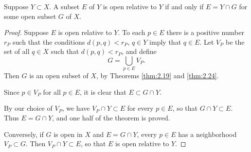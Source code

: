 \begin{thm}
    \label{thm:2.30}
    Suppose $Y \subset X$. A subset $E$ of $Y$ is open relative to $Y$ if and only if $E = Y \cap G$ for some open subset $G$ of $X$.
\end{thm}
\begin{proof}
    Suppose $E$ is open relative to $Y$. 
    To each $p \in E$ there is a positive number $r_P$ 
    such that the conditions $d(p, q) < r_P$, 
    $q \in Y$ imply that $q \in E$. 
    Let $V_P$ be the set of all $q \in X$ 
    such that $d(p, q) < r_P$, and define
    \begin{equation*}
        G = \bigcup_{p \in E} V_P.
    \end{equation*}
    Then $G$ is an open subset of $X$, by Theorems \ref{thm:2.19} and \ref{thm:2.24}. 

    Since $p \in V_P$ for all $p \in E$, 
    it is clear that $E \subset G \cap Y$.
    
    By our choice of $V_P$, 
    we have $V_P \cap Y \subset E$ for every $p \in E$, 
    so that $G \cap Y \subset E$. 
    Thus $E = G \cap Y$, and one half of the theorem is proved.
    
    Conversely, if $G$ is open in $X$ and $E = G \cap Y$, 
    every $p \in E$ has a neighborhood $V_P \subset G$. 
    Then $V_P \cap Y \subset E$, 
    so that $E$ is open relative to $Y$.
\end{proof}
